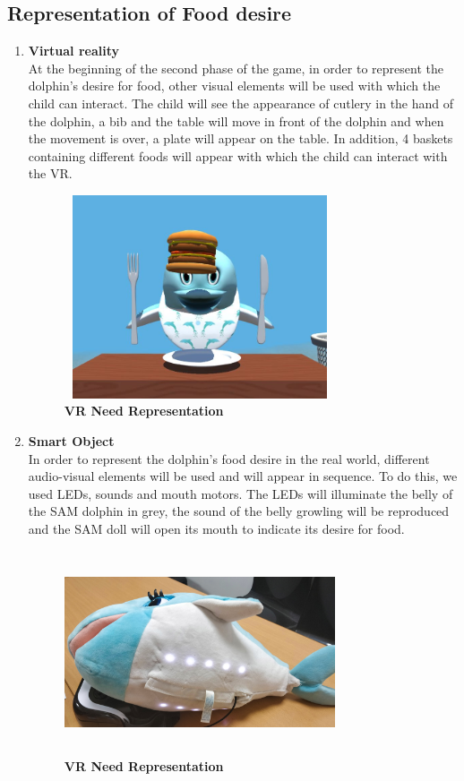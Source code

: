 \documentclass [12pt]{article}
\begin{document}
\subsection{Representation of Food desire}
\begin{enumerate}
\item \textbf{Virtual reality}\\
At the beginning of the second phase of the game, in order to represent the dolphin's desire for food, other visual elements will be used with which the child can interact. The child will see the appearance of cutlery in the hand of the dolphin, a bib and the table will move in front of the dolphin and when the movement is over, a plate will appear on the table. In addition, 4 baskets containing different foods will appear with which the child can interact with the VR. 
\begin{figure}[ht!]
\centering
\includegraphics[height=6cm,width=8cm]{FoodDesireRepresentation.JPG}
\caption{\textbf{VR Need Representation}}
\end{figure}
\item \textbf{Smart Object}\\
In order to represent the dolphin's food desire in the real world, different audio-visual elements will be used and will appear in sequence. To do this, we used LEDs, sounds and mouth motors. The LEDs will illuminate the belly of the SAM dolphin in grey, the sound of the belly growling will be reproduced and the SAM doll will open its mouth to indicate its desire for food. 
\begin{figure}[ht!]
\centering
\includegraphics[height=6cm,width=8cm]{FoodDesireRepresentationSam.jpg}
\caption{\textbf{VR Need Representation}}
\end{figure}
\end{enumerate}
\end{document}
